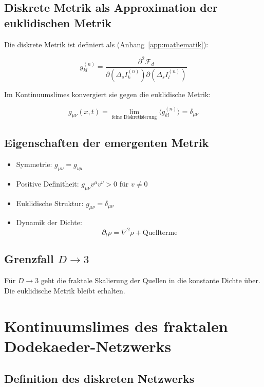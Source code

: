 \subsection{Diskrete Metrik als Approximation der euklidischen Metrik}
\label{sub:kontinuumslimes_metrik_diskret}

Die diskrete Metrik ist definiert als (Anhang~\ref{app:mathematik}):

\[
g_{kl}^{(n)} = \frac{\partial^2 \mathcal{F}_d}{\partial (\Delta_s I_k^{(n)}) \partial (\Delta_s I_l^{(n)})}
\]

Im Kontinuumslimes konvergiert sie gegen die euklidische Metrik:

\[
g_{\mu\nu}(x, t) = \lim_{\text{feine Diskretisierung}} \langle g_{kl}^{(n)} \rangle = \delta_{\mu\nu}
\]

\subsection{Eigenschaften der emergenten Metrik}
\label{sub:kontinuumslimes_metrik_eigenschaften}

\begin{itemize}
    \item Symmetrie: \( g_{\mu\nu} = g_{\nu\mu} \)
    \item Positive Definitheit: \( g_{\mu\nu} v^\mu v^\nu > 0 \) für \( v \neq 0 \)
    \item Euklidische Struktur: \( g_{\mu\nu} = \delta_{\mu\nu} \)
    \item Dynamik der Dichte:
          \[
          \partial_t \rho = \nabla^2 \rho + \text{Quellterme}
          \]
\end{itemize}

\subsection{Grenzfall \( D \to 3 \)}
\label{sub:kontinuumslimes_grenzfall_d}

Für \( D \to 3 \) geht die fraktale Skalierung der Quellen in die konstante Dichte über.
Die euklidische Metrik bleibt erhalten.

\section{Kontinuumslimes des fraktalen Dodekaeder-Netzwerks}
\label{app:kontinuumslimes_dodekaeder_netzwerk}

\subsection{Definition des diskreten Netzwerks}
\label{sub:kontinuumslimes_netz_def}


